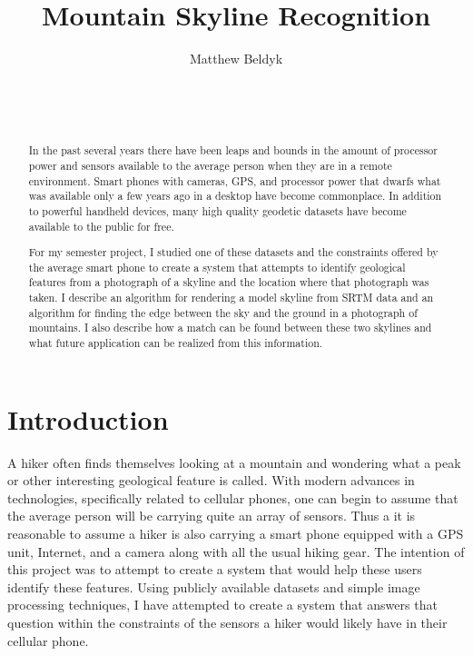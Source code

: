 \documentclass{acm_proc_article-sp}
\begin{document}
\title{Mountain Skyline Recognition}



%
\author{
\alignauthor
Matthew Beldyk\\
       \\
       \\
       \\
}

\maketitle
\begin{abstract}
In the past several years there have been leaps and bounds in the amount of processor power and sensors available to the average person when they are in a remote environment.  Smart phones with cameras, GPS, and processor power that dwarfs what was available only a few years ago in a desktop have become commonplace.  In addition to powerful handheld devices, many high quality geodetic datasets have become available to the public for free. 

For my semester project, I studied one of these datasets and the constraints offered by the average smart phone to create a system that attempts to identify geological features from a photograph of a skyline and the location where that photograph was taken.  I describe an algorithm for rendering a model skyline from SRTM data and an algorithm for finding the edge between the sky and the ground in a photograph of mountains.  I also describe how a match can be found between these two skylines and what future application can be realized from this information.
\end{abstract}

\section{Introduction}
A hiker often finds themselves looking at a mountain and wondering what a peak or other interesting geological feature is called.  With modern advances in technologies, specifically related to cellular phones, one can begin to assume that the average person will be carrying quite an array of sensors. \cite{burnette2010hello} Thus a it is reasonable to assume a hiker is also carrying a smart phone equipped with a GPS unit, Internet, and a camera along with all the usual hiking gear.  The intention of this project was to attempt to create a system that would help these users identify these features. Using publicly available datasets and simple image processing techniques, I have attempted to create a system that answers that question within the constraints of the sensors a hiker would likely have in their cellular phone.  
\end{document}
